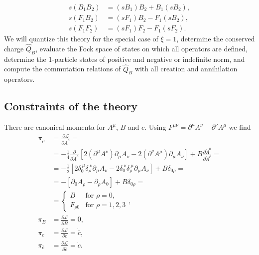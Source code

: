 \documentclass[english, parskip=full]{scrartcl}
\newcommand{\kla}{}
\newcommand{\klam}{}
\newcommand{\tecxt}{}
\begin{document}
\begin{align}
s \kla\left( B_1B_2 \right) &= \kla\left( sB_1 \right)B_2 + B_1 \kla\left( sB_2 \right),\\
s \kla\left( F_1B_2 \right) &= \kla\left( sF_1 \right) B_2 - F_1 \kla\left( sB_2 \right),\\
s \kla\left( F_1F_2 \right) &= \kla\left( sF_1 \right) F_2 - F_1 \kla\left( sF_2 \right).
\end{align}
We will quantize this theory for the special case of $\xi=1$, determine the conserved charge $\hat{Q}_B$, evaluate the Fock space of states on which all operators are defined, determine the 1-particle states of positive and negative or indefinite norm, and compute the commutation relations of $\hat{Q}_B$ with all creation and annihilation operators.
\subsection{Constraints of the theory}
There are canonical momenta for $A^\mu$, $B$ and $c$.
Using $F^{\mu\nu} = \partial^\mu A^\nu - \partial^\nu A^\mu$ we find
\begin{align}
\pi_\rho &= \frac{\partial \mathcal{L}}{\partial \dot{A}^\rho} = \\
&= -\frac{1}{4} \frac{\partial}{\partial \dot{A}^\rho} \klam\left[ 2  \kla\left( \partial^\mu A^\nu \right) \partial_\mu A_\nu - 2 \kla\left( \partial^\nu A^\mu  \right) \partial_\mu A_\nu \right] + B \frac{\partial \dot{A}^0}{\partial \dot{A}^\rho} = \\
&= -\frac{1}{2} \klam\left[ 2\delta_{0}^{\ \mu} \delta_{\rho}^{\ \nu} \partial_\mu A_\nu - 2\delta_{0}^{\ \nu}\delta_{\rho}^{\ \mu} \partial_\mu A_\nu \right] + B\delta_{0\rho} = \\
&= - \klam\left[ \partial_0 A_\rho - \partial_\rho A_0 \right] + B\delta_{0\rho} = \\
&= \begin{cases} B &\tecxt\text{for } \rho = 0,\\
F_{\rho 0} &\tecxt\text{for } \rho = 1,2,3 \end{cases},\\
\pi_B &= \frac{\partial \mathcal{L}}{\partial \dot{B}} = 0,\\
\pi_c &= \frac{\partial \mathcal{L}}{\partial \dot{c}} = \dot{\bar{c}},\\
\pi_{\bar{c}} &= \frac{\partial \mathcal{L}}{\partial \dot{\bar{c}}} = \dot{c}.
\end{align}
\end{document}
